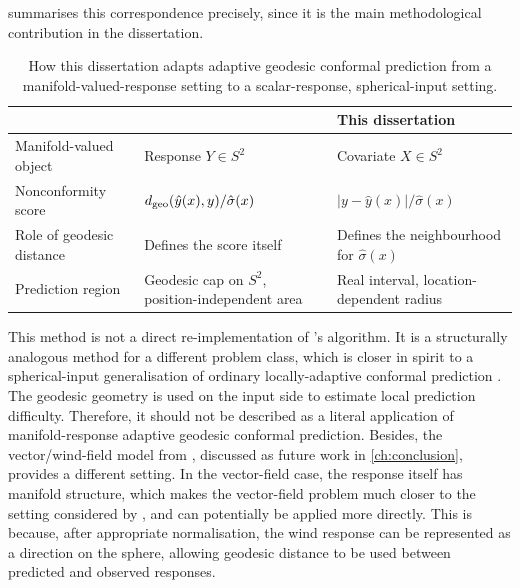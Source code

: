  summarises this correspondence precisely, since it is the main methodological contribution in the dissertation.
\begin{table}[H]
\centering
\caption{How this dissertation adapts adaptive geodesic conformal prediction from a manifold-valued-response setting to a scalar-response, spherical-input setting.}
\label{tab:adaptation-summary}
\begin{tabular}{p{3.6cm}p{5.1cm}p{5.1cm}}
\toprule
& \citet{amirishahbazi2026} & This dissertation \\
\midrule
Manifold-valued object & Response $Y \in S^2$ & Covariate $X \in S^2$ \\
Nonconformity score & $d_{\mathrm{geo}}(\hat y(x),y)/\hat\sigma(x)$ & $|y-\hat y(x)|/\hat\sigma(x)$ \\
Role of geodesic distance & Defines the score itself & Defines the neighbourhood for $\hat\sigma(x)$ \\
Prediction region & Geodesic cap on $S^2$, position-independent area & Real interval, location-dependent radius \\
\bottomrule
\end{tabular}
\end{table}

This method is not a direct re-implementation of \citet{amirishahbazi2026}'s algorithm. It is a structurally analogous method for a different problem class, which is closer in spirit to a spherical-input generalisation of ordinary locally-adaptive conformal prediction \citep{lei2018,romano2019}. The geodesic geometry is used on the input side to estimate local prediction difficulty. Therefore, it should not be described as a literal application of manifold-response adaptive geodesic conformal prediction. Besides, the vector/wind-field model from \citet{thomas2025}, discussed as future work in \cref{ch:conclusion}, provides a different setting.  In the vector-field case, the response itself has manifold structure, which makes the vector-field problem much closer to the setting considered by \citet{amirishahbazi2026}, and can potentially be applied more directly. This is because, after appropriate normalisation, the wind response can be represented as a direction on the sphere, allowing geodesic distance to be used between predicted and observed responses.
 
